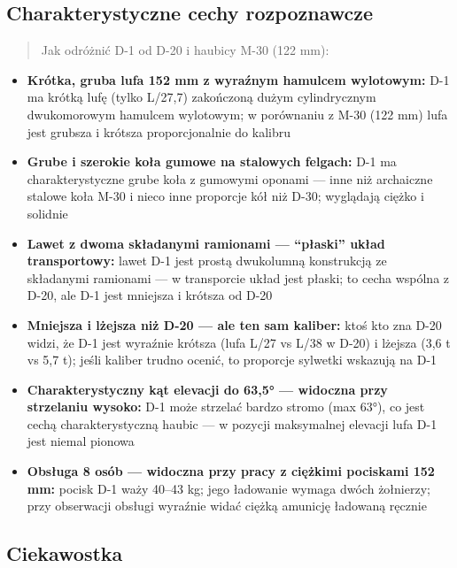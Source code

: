 \documentclass[12pt,oneside]{book}
\providecommand{\tightlist}{%
  \setlength{\itemsep}{0pt}\setlength{\parskip}{0pt}}
\begin{document}
\subsection{Charakterystyczne cechy
rozpoznawcze}\label{charakterystyczne-cechy-rozpoznawcze-29}

\begin{quote}
Jak odróżnić D-1 od D-20 i haubicy M-30 (122 mm):
\end{quote}

\begin{itemize}
\tightlist
\item
  \textbf{Krótka, gruba lufa 152 mm z wyraźnym hamulcem wylotowym:} D-1
  ma krótką lufę (tylko L/27,7) zakończoną dużym cylindrycznym
  dwukomorowym hamulcem wylotowym; w porównaniu z M-30 (122 mm) lufa
  jest grubsza i krótsza proporcjonalnie do kalibru
\item
  \textbf{Grube i szerokie koła gumowe na stalowych felgach:} D-1 ma
  charakterystyczne grube koła z gumowymi oponami --- inne niż
  archaiczne stalowe koła M-30 i nieco inne proporcje kół niż D-30;
  wyglądają ciężko i solidnie
\item
  \textbf{Lawet z dwoma składanymi ramionami --- ``płaski'' układ
  transportowy:} lawet D-1 jest prostą dwukolumną konstrukcją ze
  składanymi ramionami --- w transporcie układ jest płaski; to cecha
  wspólna z D-20, ale D-1 jest mniejsza i krótsza od D-20
\item
  \textbf{Mniejsza i lżejsza niż D-20 --- ale ten sam kaliber:} ktoś kto
  zna D-20 widzi, że D-1 jest wyraźnie krótsza (lufa L/27 vs L/38 w
  D-20) i lżejsza (3,6 t vs 5,7 t); jeśli kaliber trudno ocenić, to
  proporcje sylwetki wskazują na D-1
\item
  \textbf{Charakterystyczny kąt elevacji do 63,5° --- widoczna przy
  strzelaniu wysoko:} D-1 może strzelać bardzo stromo (max 63°), co jest
  cechą charakterystyczną haubic --- w pozycji maksymalnej elevacji lufa
  D-1 jest niemal pionowa
\item
  \textbf{Obsługa 8 osób --- widoczna przy pracy z ciężkimi pociskami
  152 mm:} pocisk D-1 waży 40--43 kg; jego ładowanie wymaga dwóch
  żołnierzy; przy obserwacji obsługi wyraźnie widać ciężką amunicję
  ładowaną ręcznie
\end{itemize}

\subsection{Ciekawostka}\label{ciekawostka-29}
\end{document}
